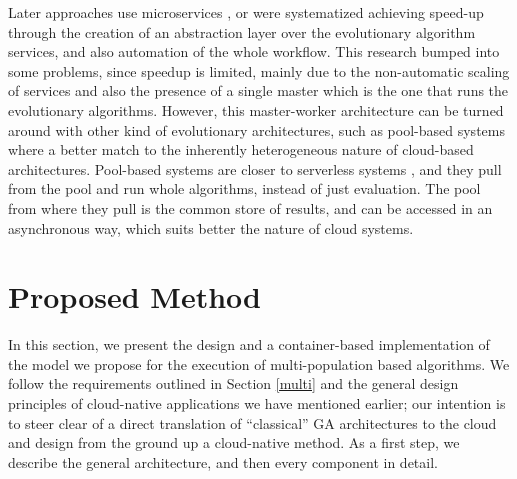 \documentclass[review]{elsarticle}
\begin{document}
Later approaches use microservices \cite{khalloof2018generic}, or were
systematized \cite{salza2019speed} achieving speed-up through the
creation of an abstraction layer over the evolutionary algorithm
services, and also automation of the whole workflow. This research
bumped into some problems, since speedup is limited, mainly due to the
non-automatic scaling of services and also the presence of a single
master which is the one that runs the evolutionary
algorithms. However, this master-worker architecture can be turned
around with other kind of evolutionary architectures, such
as pool-based systems
\cite{valenzuela2015implementing,merelo2012sofea,sofea:cec2012} where
a better match to the inherently heterogeneous nature of cloud-based
architectures. Pool-based systems are closer to serverless systems
\cite{malawski2017serverless}, and they pull from the pool and run
whole algorithms, instead of just evaluation. The pool from where they
pull is the common store of results, and can be accessed in an
asynchronous way, which suits better the nature of cloud systems.






\section{Proposed Method} 
\label{method} 

In this section, we present the design
and a container-based implementation of the model we propose for the execution
of multi-population based algorithms. We follow the requirements outlined in
Section \ref{multi} and the general design principles of cloud-native
applications we have mentioned earlier; our intention is to steer
clear of a direct translation of ``classical'' GA architectures to the
cloud and design from the ground up a cloud-native method. As a first step, we describe the general
architecture, and then  every component in detail. 
\end{document}
